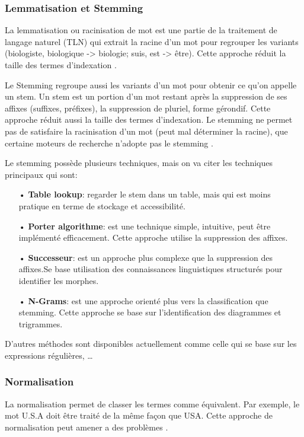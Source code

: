\subsubsection{Lemmatisation et Stemming}
La lemmatisation ou racinisation de mot est une partie de la traitement de langage naturel (TLN) qui extrait la racine d'un mot pour regrouper les variants (biologiste, biologique -> biologie; suis, est -> être). Cette approche réduit la taille des termes d'indexation \citep*{approche-semantique, sarch-engine-vsm}.

Le Stemming regroupe aussi les variants d'un mot pour obtenir ce qu'on appelle un stem. Un stem est un portion d'un mot restant après la suppression de ses affixes (suffixes, préfixes), la suppression de pluriel, forme gérondif. Cette approche réduit aussi la taille des termes d'indexation. Le stemming ne permet pas de satisfaire la racinisation d'un mot (peut mal déterminer la racine), que certaine moteurs de recherche n'adopte pas le stemming \citep*{modern-ir, vsm}.

Le stemming possède plusieurs techniques, mais on va citer les techniques principaux qui sont:

\begin{itemize}
    \item[•] \textbf{Table lookup}: regarder le stem dans un table, mais qui est moins pratique en terme de stockage et accessibilité.
    \item[•] \textbf{Porter algorithme}: est une technique simple, intuitive, peut être implémenté efficacement. Cette approche utilise la suppression des affixes.
    \item[•] \textbf{Successeur}: est un approche plus complexe que la suppression des affixes.Se base utilisation des connaissances linguistiques structurés pour identifier les morphes.
    \item[•] \textbf{N-Grams}: est une approche orienté plus vers la classification que stemming. Cette approche se base sur l'identification des diagrammes et trigrammes.
\end{itemize}

D'autres méthodes sont disponibles actuellement comme celle qui se base sur les expressions régulières, \dots

\subsubsection{Normalisation}
La normalisation permet de classer les termes comme équivalent. Par exemple, le mot U.S.A doit être traité de la même façon que USA. Cette approche de normalisation peut amener a des problèmes \citep{sarch-engine-vsm}.

